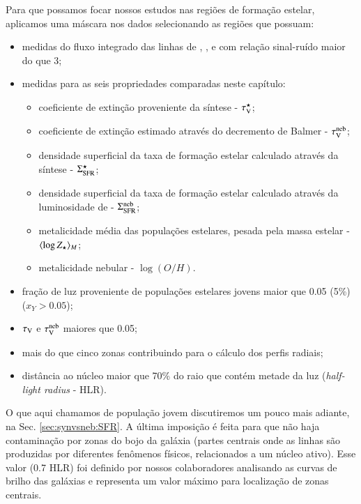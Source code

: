 Para que possamos focar nossos estudos nas regiões de formação estelar, aplicamos uma máscara nos
dados selecionando as regiões que possuam:
\begin{itemize}
  \setlength\itemsep{0.2cm}
  \item medidas do fluxo integrado das linhas de \Hbeta, \oIII, \Halpha e \nII com relação
sinal-ruído maior do que 3;
  \item medidas para as seis propriedades comparadas neste capítulo:
  \begin{itemize}
    \item coeficiente de extinção proveniente da síntese - $\tau_{\mathrm{V}}^\star$;
    \item coeficiente de extinção estimado através do decremento de Balmer - $\tau_{\mathrm{V}}^{\mathrm{neb}}$;
    \item densidade superficial da taxa de formação estelar calculado através da síntese -
$\Sigma_{\mathrm{SFR}}^\star$;
	\item densidade superficial da taxa de formação estelar calculado através da luminosidade de
\Halpha - $\Sigma_{\mathrm{SFR}}^{\mathrm{neb}}$;
	\item metalicidade média das populações estelares, pesada pela massa estelar - $\meanM{\log
Z_\star}$;
	\item metalicidade nebular - $\log(O/H)$.
  \end{itemize}
  \item fração de luz proveniente de populações estelares jovens maior que 0.05 (5\%) ($x_Y >
0.05$);
  \item $\tau_{\mathrm{V}}$ e $\tau_{\mathrm{V}}^{\mathrm{neb}}$ maiores que 0.05;
  \item mais do que cinco zonas contribuindo para o cálculo dos perfis radiais;
  \item distância ao núcleo maior que 70\% do raio que contém metade da luz ({\em half-light radius}
  - HLR).
\end{itemize}
\noindent O que aqui chamamos de população jovem discutiremos um pouco mais adiante, na Sec.
\ref{sec:synvsneb:SFR}. A última imposição é feita para que não haja contaminação por zonas
do bojo da galáxia (partes centrais onde as linhas são produzidas por diferentes fenômenos físicos,
relacionados a um núcleo ativo). Esse valor (0.7 HLR) foi definido por nossos colaboradores
analisando as curvas de brilho das galáxias e representa um valor máximo para localização de zonas
centrais. 


